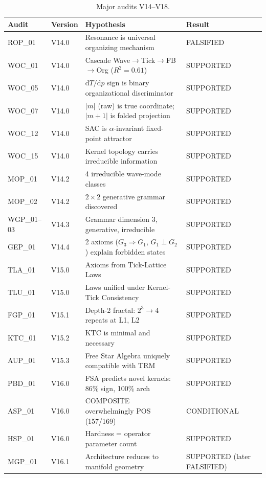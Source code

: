 \documentclass[11pt,a4paper,oneside]{report}
\newcommand{\dTdp}{\ensuremath{\mathrm{d}T/\mathrm{d}p}}
\newcommand{\supported}{\textcolor{supported}{SUPPORTED}}
\newcommand{\conditional}{\textcolor{conditional}{CONDITIONAL}}
\newcommand{\falsified}{\textcolor{falsified}{FALSIFIED}}
\begin{document}
\begin{appendices}
\begin{table}[h]
\centering
\caption{Major audits V14--V18.}
\label{tab:audits}
\small
\begin{tabular}{llp{5.5cm}l}
\toprule
\textbf{Audit} & \textbf{Version} & \textbf{Hypothesis} & \textbf{Result}\\
\midrule
ROP\_01 & V14.0 & Resonance is universal organizing mechanism & \falsified{}\\
WOC\_01 & V14.0 & Cascade Wave$\rightarrow$Tick$\rightarrow$FB$\rightarrow$Org ($R^2=0.61$) & \supported{}\\
WOC\_05 & V14.0 & $\dTdp$ sign is binary organizational discriminator & \supported{}\\
WOC\_07 & V14.0 & $|m|$ (raw) is true coordinate; $|m+1|$ is folded projection & \supported{}\\
WOC\_12 & V14.0 & SAC is $\alpha$-invariant fixed-point attractor & \supported{}\\
WOC\_15 & V14.0 & Kernel topology carries irreducible information & \supported{}\\
MOP\_01 & V14.2 & 4 irreducible wave-mode classes & \supported{}\\
MOP\_02 & V14.2 & $2\times 2$ generative grammar discovered & \supported{}\\
WGP\_01--03 & V14.3 & Grammar dimension 3, generative, irreducible & \supported{}\\
GEP\_01 & V14.4 & 2 axioms ($G_3\Rightarrow G_1$, $G_1\perp G_2$) explain forbidden states & \supported{}\\
TLA\_01 & V15.0 & Axioms from Tick-Lattice Laws & \supported{}\\
TLU\_01 & V15.0 & Laws unified under Kernel-Tick Consistency & \supported{}\\
FGP\_01 & V15.1 & Depth-2 fractal: $2^3\rightarrow 4$ repeats at L1, L2 & \supported{}\\
KTC\_01 & V15.2 & KTC is minimal and necessary & \supported{}\\
AUP\_01 & V15.3 & Free Star Algebra uniquely compatible with TRM & \supported{}\\
PBD\_01 & V16.0 & FSA predicts novel kernels: 86\% sign, 100\% arch & \supported{}\\
ASP\_01 & V16.0 & COMPOSITE overwhelmingly POS (157/169) & \conditional{}\\
HSP\_01 & V16.0 & Hardness = operator parameter count & \supported{}\\
MGP\_01 & V16.1 & Architecture reduces to manifold geometry & \supported{} (later \falsified{})\\

\end{tabular}
\end{table}
\end{appendices}
\end{document}
